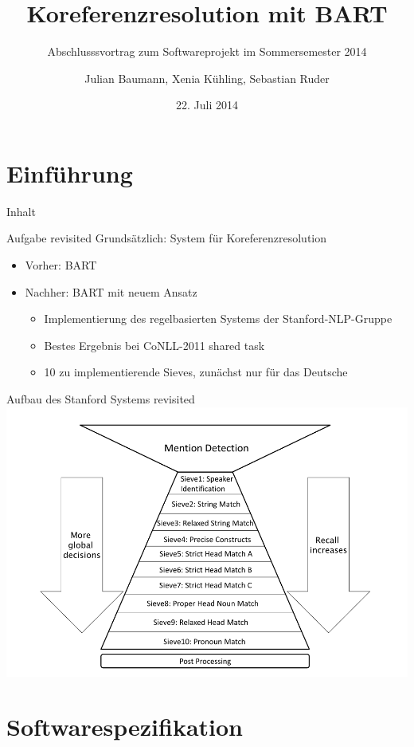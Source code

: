 \documentclass[11pt,a4paper]{beamer}
\author{Julian Baumann, Xenia Kühling, Sebastian Ruder}
\title{Koreferenzresolution mit BART}
\subtitle{Abschlusssvortrag zum Softwareprojekt im Sommersemester 2014}
\date{22. Juli 2014}
\begin{document}
\maketitle

\section{Einführung}

\begin{frame}{Inhalt}
\tableofcontents
\end{frame}

\begin{frame}{Aufgabe revisited}
Grundsätzlich: System für Koreferenzresolution
\begin{itemize}
\item Vorher: BART
\item Nachher: BART mit neuem Ansatz
\begin{itemize}
\item Implementierung des regelbasierten Systems der Stanford-NLP-Gruppe
\item Bestes Ergebnis bei CoNLL-2011 shared task
\item 10 zu implementierende Sieves, zunächst nur für das Deutsche
\end{itemize}
\end{itemize}
\end{frame}


\begin{frame}{Aufbau des Stanford Systems revisited}
\includegraphics[scale=0.29]{stanford.png}
\end{frame}


\section{Softwarespezifikation}
\end{document}
